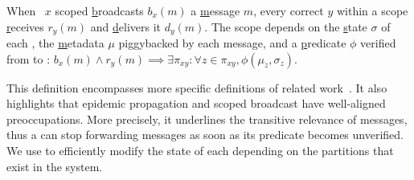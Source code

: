 
\begin{definition}
  When \Process~$x$ scoped \underline{b}roadcasts $b_x(m)$ a
  \underline{m}essage $m$, every correct \process $y$ within a scope
  \underline{r}eceives $r_y(m)$ and \underline{d}elivers it
  $d_y(m)$. The scope depends on the \underline{s}tate $\sigma$ of
  each \process, the \underline{m}etadata $\mu$ piggybacked by each
  message, and a \underline{p}redicate $\phi$ verified from \process to
  \process: $b_x(m) \wedge r_y(m) \implies \exists \pi_{xy}: \forall z
  \in \pi_{xy}, \phi(\mu_z, \sigma_z)$.
\end{definition}

This definition encompasses more specific definitions of related
work~\cite{hsiao2005scoped, lue2006scoped, wang2015prodiluvian}.  It
also highlights that epidemic propagation and scoped broadcast have
well-aligned preoccupations. More precisely, it underlines the
transitive relevance of messages, thus a \process can stop forwarding
messages as soon as its predicate becomes unverified.
%
We use \NAMEB to efficiently modify the state of each \process
depending on the partitions that exist in the system.

